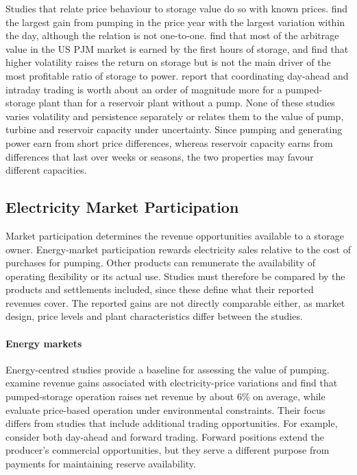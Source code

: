 Studies that relate price behaviour to storage value do so with known
prices. \citet{ak2019quantifying} find the largest gain from pumping in
the price year with the largest variation within the day, although the
relation is not one-to-one. \citet{sioshansi2009estimating} find that
most of the arbitrage value in the US PJM market is earned by the first
hours of storage, and \citet{bradbury2014economic} find that higher
volatility raises the return on storage but is not the main driver of
the most profitable ratio of storage to power.
\citet{lohndorf2023} report that coordinating day-ahead and intraday
trading is worth about an order of magnitude more for a pumped-storage
plant than for a reservoir plant without a pump. None of these studies
varies volatility and persistence separately or relates them to the
value of pump, turbine and reservoir capacity under uncertainty. Since
pumping and generating power earn from short price differences, whereas
reservoir capacity earns from differences that last over weeks or
seasons, the two properties may favour different capacities.

\subsection{Electricity Market Participation}
\label{sec:lit_markets}

Market participation determines the revenue opportunities available to
a storage owner. Energy-market participation rewards electricity sales
relative to the cost of purchases for pumping. Other products can
remunerate the availability of operating flexibility or its actual use.
Studies must therefore be compared by the products and settlements
included, since these define what their reported revenues cover. The
reported gains are not directly comparable either, as market design,
price levels and plant characteristics differ between the studies.

\paragraph{Energy markets}
Energy-centred studies provide a baseline for assessing the value of
pumping. \citet{ak2019quantifying} examine revenue gains associated with
electricity-price variations and find that pumped-storage operation
raises net revenue by about 6\% on average, while \citet{alic2023optimal}
evaluate price-based operation under environmental constraints. Their
focus differs from studies that include additional trading
opportunities. For example, \citet{abgottspon2013stochastic} consider
both day-ahead and forward trading. Forward positions extend the
producer's commercial opportunities, but they serve a different purpose
from payments for maintaining reserve availability.

